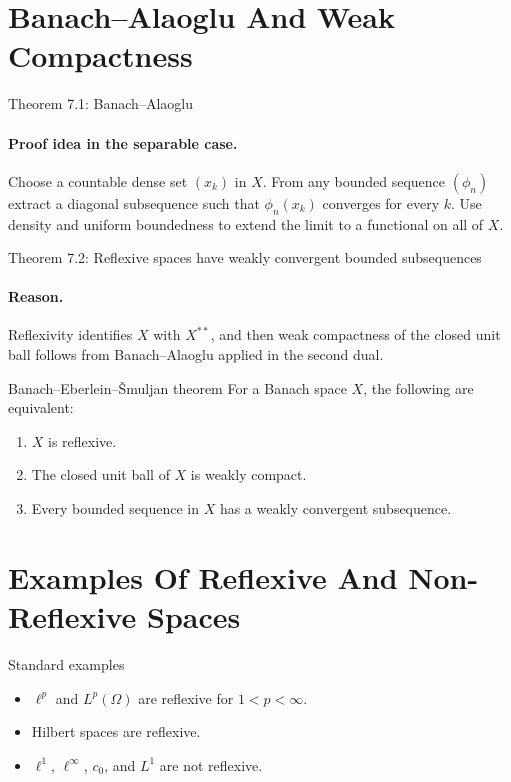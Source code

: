 \documentclass[11pt]{article}
\begin{document}
\section{Banach--Alaoglu And Weak Compactness}

\begin{thmbox}{Theorem 7.1: Banach--Alaoglu}
\thmBanachAlaoglu
\end{thmbox}

\paragraph{Proof idea in the separable case.}
Choose a countable dense set $(x_k)$ in $X$. From any bounded sequence $(\phi_n)$ extract a diagonal subsequence such that $\phi_n(x_k)$ converges for every $k$. Use density and uniform boundedness to extend the limit to a functional on all of $X$.

\begin{thmbox}{Theorem 7.2: Reflexive spaces have weakly convergent bounded subsequences}
\thmReflexiveWeaklyCompact
\end{thmbox}

\paragraph{Reason.}
Reflexivity identifies $X$ with $X^{**}$, and then weak compactness of the closed unit ball follows from Banach--Alaoglu applied in the second dual.

\begin{thmbox}{Banach--Eberlein--\v Smuljan theorem}
For a Banach space $X$, the following are equivalent:
\begin{enumerate}
\item $X$ is reflexive.
\item The closed unit ball of $X$ is weakly compact.
\item Every bounded sequence in $X$ has a weakly convergent subsequence.
\end{enumerate}
\end{thmbox}

\section{Examples Of Reflexive And Non-Reflexive Spaces}

\begin{exbox}{Standard examples}
\begin{itemize}
\item $\ell^p$ and $L^p(\Omega)$ are reflexive for $1<p<\infty$.
\item Hilbert spaces are reflexive.
\item $\ell^1$, $\ell^\infty$, $c_0$, and $L^1$ are not reflexive.
\end{itemize}
\end{exbox}
\end{document}
